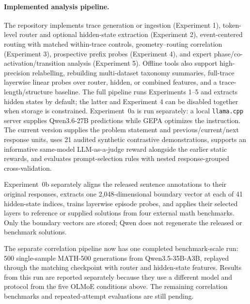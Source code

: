 \documentclass[manuscript,screen,review]{jair}
\begin{document}
\paragraph{Implemented analysis pipeline.}
The repository implements trace generation or ingestion (Experiment 1),
token-level router and optional hidden-state extraction (Experiment 2),
event-centered routing with matched within-trace controls, geometry--routing
correlation (Experiment 3), prospective prefix probes (Experiment 4), and
expert phase/co-activation/transition analysis (Experiment 5).  Offline tools
also support high-precision relabelling, rebuilding multi-dataset taxonomy
summaries, full-trace layerwise linear probes over router, hidden, or combined
features, and a trace-length/structure baseline.  The full pipeline runs
Experiments 1--5 and extracts hidden states by default; the latter and
Experiment 4 can be disabled together when storage is constrained.
Experiment~0a is run separately: a local \texttt{llama.cpp} server supplies
Qwen3.6-27B predictions while GEPA optimizes the instruction.  The current
version supplies the problem statement and previous/current/next response
units, uses 21 audited synthetic contrastive demonstrations, supports
an informative same-model LLM-as-a-judge reward alongside the earlier static
rewards, and evaluates prompt-selection rules with nested response-grouped
cross-validation.

Experiment~0b separately aligns the released sentence annotations to their
original responses, extracts one 2,048-dimensional boundary vector at each of
41 hidden-state indices, trains layerwise episode probes, and applies their
selected layers to reference or supplied solutions from four external math
benchmarks.  Only the boundary vectors are stored; Qwen does not regenerate
the released or benchmark solutions.

The separate correlation pipeline now has one completed benchmark-scale run:
500 single-sample MATH-500 generations from Qwen3.5-35B-A3B, replayed through
the matching checkpoint with router and hidden-state features.  Results from
this run are reported separately because they use a different model and
protocol from the five OLMoE conditions above.  The remaining correlation
benchmarks and repeated-attempt evaluations are still pending.
\end{document}
